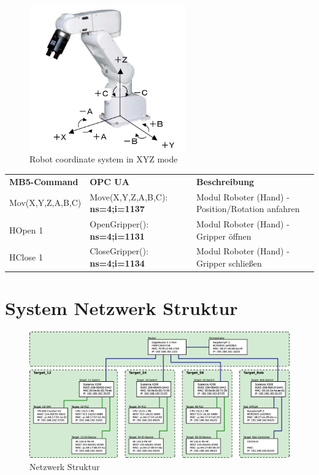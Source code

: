 \documentclass[11pt,a4paper,ngerman]{article}
\begin{document}
\begin{figure}[htp]
	\centering
	\includegraphics[width=0.6\textwidth]{images/robot_axis.png}
	\caption{Robot coordinate system in XYZ mode}
	\label{fig:robot_axis}
\end{figure}

\begin{center}
	\setlength\extrarowheight{4pt}
	\small
	
	\begin{tabularx}{\textwidth}{|p{3cm}|p{4cm}|X|}
		\hline
		\rowcolor{tublau}
		\multicolumn{3}{|c|}{\bf \color{white} \large Gripper}\\
		\hline\hline
		\rowcolor{gray!80}
		\bf MB5-Command & \bf OPC UA & \bf Beschreibung\\
		\hline\hline
		Mov(X,Y,Z,A,B,C) & Move(X,Y,Z,A,B,C): \textbf{ns=4;i=1137} & Modul Roboter (Hand) - Position/Rotation anfahren\\
		HOpen 1 & OpenGripper(): \textbf{ns=4;i=1131} & Modul Roboter (Hand) - Gripper öffnen\\
		HClose 1 & CloseGripper(): \textbf{ns=4;i=1134} & Modul Roboter (Hand) - Gripper schließen\\
		\hline
	\end{tabularx}
\end{center}

\clearpage

\section{System Netzwerk Struktur}
\begin{figure}[!htb]
	\centering
	\includegraphics[width=.99\linewidth]{images/Network_Structure}
	\caption{Netzwerk Struktur}
	\label{fig_network_structure}
\end{figure}




\newpage
%
%

\makelast
\end{document}
